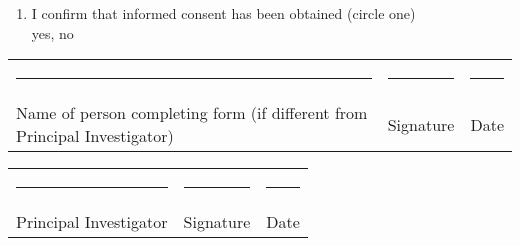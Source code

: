 \documentclass[a4paper,10pt]{article}
\begin{document}
\begin{enumerate}
\item I confirm that informed consent has been obtained (circle one)\\
      yes, no
        
 \end{enumerate}

 \begin{tabular}{p{4cm}p{4cm}p{4cm}}
    \rule{10em}{.3pt} & \rule{10em}{.3pt} & \rule{10em}{.3pt} \\
     Name of person completing form (if different from Principal Investigator) & Signature &  Date \\
\end{tabular}

\vspace{0.6cm}

 \begin{tabular}{p{4cm}p{4cm}p{4cm}}
    \rule{10em}{.3pt} & \rule{10em}{.3pt} & \rule{10em}{.3pt} \\
     Principal Investigator & Signature &  Date \\
 \end{tabular}
\end{document}
